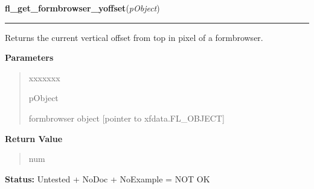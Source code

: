 \hspace{.8\funcindent}\begin{boxedminipage}{\funcwidth}

    \raggedright \textbf{fl\_get\_formbrowser\_yoffset}(\textit{pObject})

    \vspace{-1.5ex}

    \rule{\textwidth}{0.5\fboxrule}
\setlength{\parskip}{2ex}
    Returns the current vertical offset from top in pixel of a formbrowser.

\setlength{\parskip}{1ex}
      \textbf{Parameters}
      \vspace{-1ex}

      \begin{quote}
        \begin{Ventry}{xxxxxxx}

          \item[pObject]

          formbrowser object [pointer to xfdata.FL\_OBJECT]

        \end{Ventry}

      \end{quote}

      \textbf{Return Value}
    \vspace{-1ex}

      \begin{quote}
      num

      \end{quote}

\textbf{Status:} Untested + NoDoc + NoExample = NOT OK



    \end{boxedminipage}

    \label{xformslib:library:fl_find_formbrowser_form_number}

    \vspace{0.5ex}

